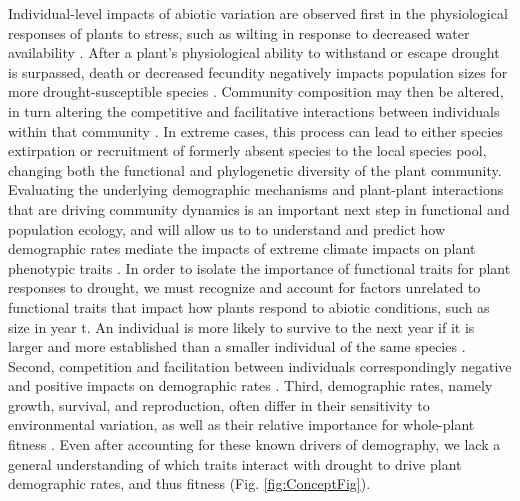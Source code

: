 \documentclass[12pt, letterpaper]{article}
\begin{document}
Individual-level impacts of abiotic variation are observed first in the physiological responses of plants to stress, such as wilting in response to decreased water availability \citep{Bartlett2012, Bartlett2016TheDrought}. After a plant’s physiological ability to withstand or escape drought is surpassed, death or decreased fecundity negatively impacts population sizes for more drought-susceptible species \citep{Koerner2014}. Community composition may then be altered, in turn altering the competitive and facilitative interactions between individuals within that community \citep{Ploughe2019CommunityInteractions, Harrison2015Climate-drivenCommunity}. In extreme cases, this process can lead to either species extirpation or recruitment of formerly absent species to the local species pool, changing both the functional and phylogenetic diversity of the plant community. Evaluating the underlying demographic mechanisms and plant-plant interactions that are driving community dynamics is an important next step in functional and population ecology, and will allow us to to understand and predict how demographic rates mediate the impacts of extreme climate impacts on plant phenotypic traits \citep{Laughlin2020TheFitness, Ploughe2019CommunityInteractions, Hoover2014ResistanceExtremes, Salguero-Gomez2012}.
In order to isolate the importance of functional traits for plant responses to drought, we must recognize and account for factors unrelated to functional traits that impact how plants respond to abiotic conditions, such as size in year t. An individual is more likely to survive to the next year if it is larger and more established than a smaller individual of the same species \citep{Tredennick2017}. Second, competition and facilitation between individuals correspondingly negative and positive impacts on demographic rates \citep{Adler2012}. Third, demographic rates, namely growth, survival, and reproduction, often differ in their sensitivity to environmental variation, as well as their relative importance for whole-plant fitness \citep{Laughlin2020TheFitness, Dibner2019}. Even after accounting for these known drivers of demography, we lack a general understanding of which traits interact with drought to drive plant demographic rates, and thus fitness \citep{Laughlin2018, Laughlin2020TheFitness}(Fig. \ref{fig:ConceptFig}).
\end{document}
